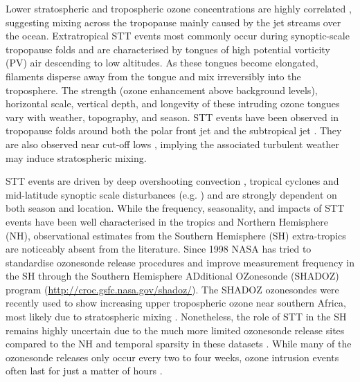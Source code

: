Lower stratospheric and tropospheric ozone concentrations are highly correlated \citep{Terao2008}, suggesting mixing across the tropopause mainly caused by the jet streams over the ocean.
Extratropical STT events most commonly occur during synoptic-scale tropopause folds \citep{Sprenger2003, Tang2012, Frey2015} and are characterised by tongues of high potential vorticity (PV) air descending to low altitudes.
As these tongues become elongated, filaments disperse away from the tongue and mix irreversibly into the troposphere.
The strength (ozone enhancement above background levels), horizontal scale, vertical depth, and longevity of these intruding ozone tongues vary with weather, topography, and season.
STT events have been observed in tropopause folds around both the polar front jet \citep{Vaughan1994, Beekmann1997} and the subtropical jet \citep{Baray2000}.
They are also observed near cut-off lows \citep{Price1993, Wirth1995}, implying the associated turbulent weather may induce stratospheric mixing.

STT events are driven by deep overshooting convection \citep{Frey2015}, tropical cyclones \citep{Das2016} and mid-latitude synoptic scale disturbances (e.g. \citet{Stohl2003, Mihalikova2012}) and are strongly dependent on both season and location. 
While the frequency, seasonality, and impacts of STT events have been well characterised in the tropics and Northern Hemisphere (NH), observational estimates from the Southern Hemisphere (SH) extra-tropics are noticeably absent from the literature. 
Since 1998 NASA has tried to standardise ozonesonde release procedures and improve measurement frequency in the SH through the Southern Hemisphere ADditional OZonesonde (SHADOZ) program (\url{http://croc.gsfc.nasa.gov/shadoz/}).
The SHADOZ ozonesondes were recently used to show increasing upper tropospheric ozone near southern Africa, most likely due to stratospheric mixing \citep{Liu2015, Thompson2014}. 
Nonetheless, the role of STT in the SH remains highly uncertain due to the much more limited ozonesonde release sites compared to the NH and temporal sparsity in these datasets  \citep{Liu2015, Thompson2014, Mze2010}. 
While many of the ozonesonde releases only occur every two to four weeks, ozone intrusion events often last for just a matter of hours \citep{Tang2012}.


